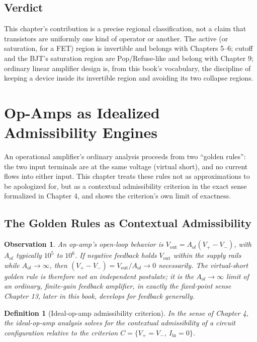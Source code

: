 \documentclass[12pt]{article}
\newtheorem{definition}{Definition}
\newtheorem{observation}{Observation}
\begin{document}
\subsection{Verdict}

This chapter's contribution is a precise regional classification, not a claim that transistors are uniformly one kind of operator or another. The active (or saturation, for a FET) region is invertible and belongs with Chapters 5--6; cutoff and the BJT's saturation region are Pop/Refuse-like and belong with Chapter 9; ordinary linear amplifier design is, from this book's vocabulary, the discipline of keeping a device inside its invertible region and avoiding its two collapse regions.

\section{Op-Amps as Idealized Admissibility Engines}

An operational amplifier's ordinary analysis proceeds from two ``golden rules'': the two input terminals are at the same voltage (virtual short), and no current flows into either input. This chapter treats these rules not as approximations to be apologized for, but as a contextual admissibility criterion in the exact sense formalized in Chapter 4, and shows the criterion's own limit of exactness.

\subsection{The Golden Rules as Contextual Admissibility}

\begin{observation}
An op-amp's open-loop behavior is $V_{\text{out}} = A_{ol}(V_+ - V_-)$, with $A_{ol}$ typically $10^5$ to $10^6$. If negative feedback holds $V_{\text{out}}$ within the supply rails while $A_{ol} \to \infty$, then $(V_+ - V_-) = V_{\text{out}}/A_{ol} \to 0$ necessarily. The virtual-short golden rule is therefore not an independent postulate; it is the $A_{ol}\to\infty$ limit of an ordinary, finite-gain feedback amplifier, in exactly the fixed-point sense Chapter 13, later in this book, develops for feedback generally.
\end{observation}

\begin{definition}[Ideal-op-amp admissibility criterion]
In the sense of Chapter 4, the ideal-op-amp analysis solves for the contextual admissibility of a circuit configuration relative to the criterion $C = \{V_+ = V_-,\ I_{\text{in}} = 0\}$.
\end{definition}
\end{document}
